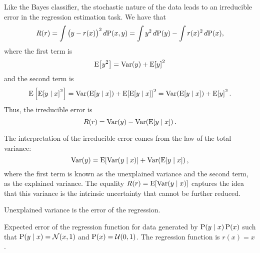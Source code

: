 Like the Bayes classifier, the stochastic nature of the data leads to an irreducible
error in the regression estimation task.  We have that
\begin{equation*}
  R(r) = \int \big(y - r(x)\big)^2\, d\!\operatorname{P}(x, y) =
    \int y^2\, d\!\operatorname{P}(y) - \int r(x)^2\, d\!\operatorname{P}(x)\text{,}
\end{equation*}
where the first term is
\[
  \operatorname{E}\!\left[y^2\right] = \operatorname{Var}(y) + \operatorname{E}\!\left[y\right]^2
\]
and the second term is
\[
  \E\left[\E\!\left[y \mid x\right]^2\right] =
    \Var\!\left(\E\!\left[y \mid x\right]\right) + \E\!\left[\E\!\left[y \mid x\right]\right]^2 =
    \Var\!\left(\E\!\left[y \mid x\right]\right) + \E\!\left[y\right]^2\text{.}
\]
Thus, the irreducible error is
\[
  R(r) = \operatorname{Var}(y) - \operatorname{Var}\!\left(\operatorname{E}\!\left[y \mid x\right]\right) \text{.}
\]

The interpretation of the irreducible error comes from the law of the total variance:
\begin{equation*}
  \operatorname{Var}(y) = \operatorname{E}\!\left[ \operatorname{Var}(y \mid x) \right] + \operatorname{Var}\!\left(\operatorname{E}\!\left[y \mid x\right]\right)\text{,}
\end{equation*}
where the first term is known as the unexplained variance and the second term, as the
explained variance.  The equality $R(r) = \operatorname{E}\!\left[ \operatorname{Var}(y \mid x) \right]$
captures the idea that this variance is the intrinsic uncertainty that cannot be further
reduced.

\begin{figurebox}[label=fig:explained-unexplained-variance]{Unexplained variance is the
  error of the regression.}
  \centering
  \tcblower
  Expected error of the regression function for data generated by
  $\operatorname{P}(y \mid x) \operatorname{P}(x)$ such that $\operatorname{P}(y \mid x) = \mathcal{N}(x, 1)$ and
  $\operatorname{P}(x) = \mathcal{U}(0, 1)$.  The regression function is $r(x) = x$.
\end{figurebox}


